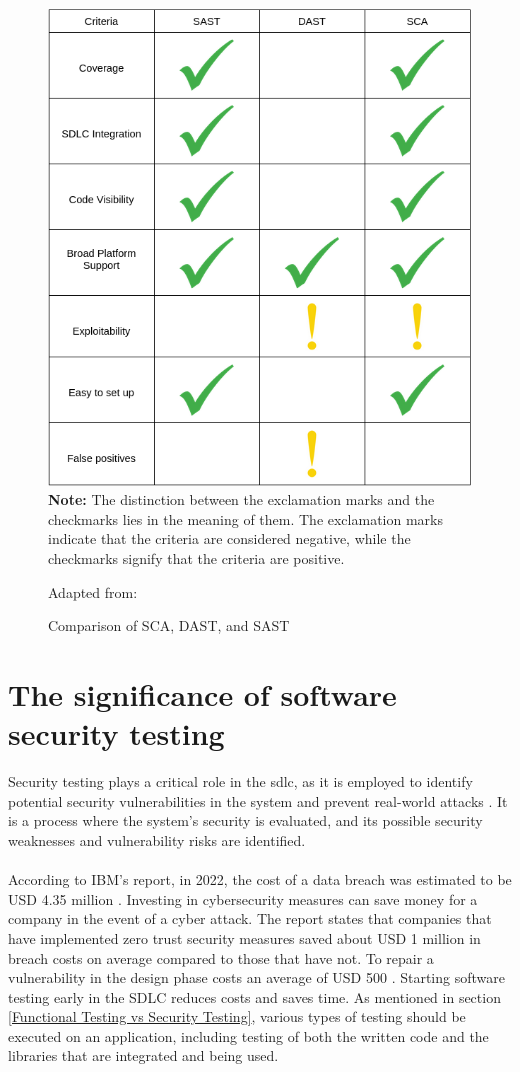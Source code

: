 \vspace{2mm}
\begin{figure}[H]
    \centering
    \includegraphics[width=0.8\columnwidth]{Images/application-security-testing.png}\\
    \textbf{Note:} The distinction between the exclamation marks and the checkmarks lies in the meaning of them. The exclamation marks indicate that the criteria are considered negative, while the checkmarks signify that the criteria are positive.
    \caption{Comparison of SCA, DAST, and SAST}Adapted from: \cite{Comparison}
    \label{fig: Comparison of SCA, DAST, and SASt}
\end{figure}
\newpage
\section{The significance of software security testing}
Security testing plays a critical role in the \acrlong{sdlc}, as it is employed to identify potential security vulnerabilities in the system and prevent real-world attacks \cite{whysectest}. It is a process where the system's security is evaluated, and its possible security weaknesses and vulnerability risks are identified. 
\\~\\
According to IBM's report, in 2022, the cost of a data breach was estimated to be USD 4.35 million \cite{databreach}. Investing in cybersecurity measures can save money for a company in the event of a cyber attack. The report states that companies that have implemented zero trust security measures saved about USD 1 million in breach costs on average compared to those that have not. To repair a vulnerability in the design phase costs an average of USD 500 \cite{fixvulnerability}. Starting software testing early in the SDLC reduces costs and saves time. As mentioned in section \ref{Functional Testing vs Security Testing}, various types of testing should be executed on an application, including testing of both the written code and the libraries that are integrated and being used.

